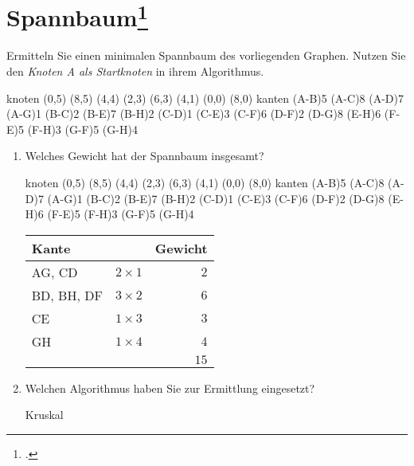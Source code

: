 \documentclass{lehramt-informatik-haupt}
\begin{document}
\section{Spannbaum\footcite[Aufgabe 6]{aud:e-klausur}}

Ermitteln Sie einen minimalen Spannbaum des vorliegenden Graphen. Nutzen
Sie den \emph{Knoten A als Startknoten} in ihrem Algorithmus.

\graph knoten {
  (0,5)
  (8,5)
  (4,4)
  (2,3)
  (6,3)
  (4,1)
  (0,0)
  (8,0)
} kanten {
  \kante(A-B){5}
  \kante(A-C){8}
  \kante(A-D){7}
  \kante(A-G){1}
  \kante(B-C){2}
  \kante(B-E){7}
  \kante(B-H){2}
  \kante(C-D){1}
  \kante(C-E){3}
  \kante(C-F){6}
  \kante(D-F){2}
  \kante(D-G){8}
  \kante(E-H){6}
  \kante(F-E){5}
  \kante(F-H){3}
  \kante(G-F){5}
  \kante(G-H){4}
}

\begin{enumerate}
\item Welches Gewicht hat der Spannbaum insgesamt?

\begin{antwort}
\graph knoten {
  (0,5)
  (8,5)
  (4,4)
  (2,3)
  (6,3)
  (4,1)
  (0,0)
  (8,0)
} kanten {
  \kante(A-B){5}
  \kante(A-C){8}
  \kante(A-D){7}
  \KANTE(A-G){1}
  \KANTE(B-C){2}
  \kante(B-E){7}
  \KANTE(B-H){2}
  \KANTE(C-D){1}
  \KANTE(C-E){3}
  \kante(C-F){6}
  \KANTE(D-F){2}
  \kante(D-G){8}
  \kante(E-H){6}
  \kante(F-E){5}
  \kante(F-H){3}
  \kante(G-F){5}
  \KANTE(G-H){4}
}

\begin{center}
\begin{tabular}{|l|l|r|}
\hline
Kante & & Gewicht\\\hline\hline
AG, CD     & $2 \times 1$ & $2$\\
BD, BH, DF & $3 \times 2$ & $6$\\
CE         & $1 \times 3$ & $3$\\
GH         & $1 \times 4$ & $4$\\\hline
           &              & $15$\\\hline
\end{tabular}
\end{center}
\end{antwort}

\item Welchen Algorithmus haben Sie zur Ermittlung eingesetzt?

\begin{antwort}
Kruskal
\end{antwort}
\end{enumerate}

\literatur
\end{document}
